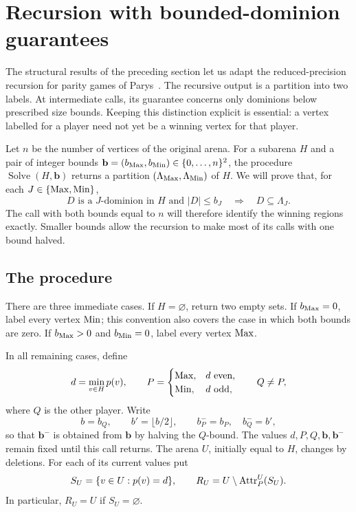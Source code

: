 \section{Recursion with bounded-dominion guarantees}
\label{sec:algorithm}

The structural results of the preceding section let us adapt the
reduced-precision recursion for parity games of Parys~\cite{Parys2019}.
The recursive output is a partition into two labels.  At intermediate
calls, its guarantee concerns only dominions below prescribed size
bounds.  Keeping this distinction explicit is essential: a vertex
labelled for a player need not yet be a winning vertex for that player.

\providecommand{\Solve}{\operatorname{Solve}}
\providecommand{\Phase}{\operatorname{Phase}}
Let $n$ be the number of vertices of the original arena.  For a subarena
$H$ and a pair of integer bounds
$\mathbf b=(b_{\mathrm{Max}},b_{\mathrm{Min}})\in\{0,\ldots,n\}^2$, the procedure
$\Solve(H,\mathbf b)$ returns a partition
$(\Lambda_{\mathrm{Max}},\Lambda_{\mathrm{Min}})$ of $H$.  We will prove that, for each
$J\in\{\mathrm{Max},\mathrm{Min}\}$,
\begin{equation}
\label{eq:label-guarantee}
 D\text{ is a $J$-dominion in $H$ and }|D|\le b_J
 \quad\Longrightarrow\quad D\subseteq\Lambda_J.
\end{equation}
The call with both bounds equal to $n$ will therefore identify the
winning regions exactly.  Smaller bounds allow the recursion to make
most of its calls with one bound halved.

\subsection{The procedure}

There are three immediate cases.  If $H=\varnothing$, return two empty
sets.  If $b_{\mathrm{Max}}=0$, label every vertex $\mathrm{Min}$; this convention also
covers the case in which both bounds are zero.  If $b_{\mathrm{Max}}>0$ and
$b_{\mathrm{Min}}=0$, label every vertex $\mathrm{Max}$.

In all remaining cases, define
\[
 d=\min_{v\in H}p(v),\qquad
 P=\begin{cases}\mathrm{Max},&d\text{ even},\\ \mathrm{Min},&d\text{ odd},\end{cases}
 \qquad Q\ne P,
\]
where $Q$ is the other player.  Write
\[
 b=b_Q,\qquad b'=\lfloor b/2\rfloor,
 \qquad b^-_P=b_P,\quad b^-_Q=b',
\]
so that $\mathbf b^-$ is obtained from $\mathbf b$ by halving the
$Q$-bound.  The values $d,P,Q,\mathbf b,\mathbf b^-$ remain fixed until
this call returns.  The arena $U$, initially equal to $H$, changes by
deletions.  For each of its current values put
\begin{equation}
\label{eq:current-residual}
 S_U=\{v\in U:p(v)=d\},\qquad
 R_U=U\setminus\operatorname{Attr}_P^U(S_U).
\end{equation}
In particular, $R_U=U$ if $S_U=\varnothing$.

